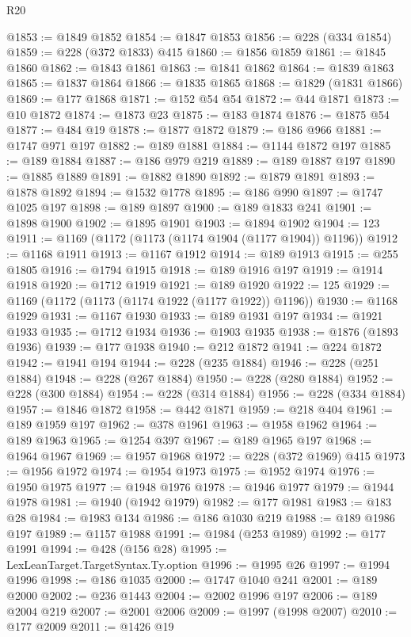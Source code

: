 \begin{lexlean}{R20}
\begin{coremodule}
@1853 := @1849 @1852
@1854 := @1847 @1853
@1856 := @228 (@334 @1854)
@1859 := @228 (@372 @1833) @415
@1860 := @1856 @1859
@1861 := @1845 @1860
@1862 := @1843 @1861
@1863 := @1841 @1862
@1864 := @1839 @1863
@1865 := @1837 @1864
@1866 := @1835 @1865
@1868 := @1829 (@1831 @1866)
@1869 := @177 @1868
@1871 := @152 @54 @54
@1872 := @44 @1871
@1873 := @10 @1872
@1874 := @1873 @23
@1875 := @183 @1874
@1876 := @1875 @54
@1877 := @484 @19
@1878 := @1877 @1872
@1879 := @186 @966
@1881 := @1747 @971 @197
@1882 := @189 @1881
@1884 := @1144 @1872 @197
@1885 := @189 @1884
@1887 := @186 @979 @219
@1889 := @189 @1887 @197
@1890 := @1885 @1889
@1891 := @1882 @1890
@1892 := @1879 @1891
@1893 := @1878 @1892
@1894 := @1532 @1778
@1895 := @186 @990
@1897 := @1747 @1025 @197
@1898 := @189 @1897
@1900 := @189 @1833 @241
@1901 := @1898 @1900
@1902 := @1895 @1901
@1903 := @1894 @1902
@1904 := 123
@1911 := @1169 (@1172 (@1173 (@1174 @1904 (@1177 @1904)) @1196))
@1912 := @1168 @1911
@1913 := @1167 @1912
@1914 := @189 @1913
@1915 := @255 @1805
@1916 := @1794 @1915
@1918 := @189 @1916 @197
@1919 := @1914 @1918
@1920 := @1712 @1919
@1921 := @189 @1920
@1922 := 125
@1929 := @1169 (@1172 (@1173 (@1174 @1922 (@1177 @1922)) @1196))
@1930 := @1168 @1929
@1931 := @1167 @1930
@1933 := @189 @1931 @197
@1934 := @1921 @1933
@1935 := @1712 @1934
@1936 := @1903 @1935
@1938 := @1876 (@1893 @1936)
@1939 := @177 @1938
@1940 := @212 @1872
@1941 := @224 @1872
@1942 := @1941 @194
@1944 := @228 (@235 @1884)
@1946 := @228 (@251 @1884)
@1948 := @228 (@267 @1884)
@1950 := @228 (@280 @1884)
@1952 := @228 (@300 @1884)
@1954 := @228 (@314 @1884)
@1956 := @228 (@334 @1884)
@1957 := @1846 @1872
@1958 := @442 @1871
@1959 := @218 @404
@1961 := @189 @1959 @197
@1962 := @378 @1961
@1963 := @1958 @1962
@1964 := @189 @1963
@1965 := @1254 @397
@1967 := @189 @1965 @197
@1968 := @1964 @1967
@1969 := @1957 @1968
@1972 := @228 (@372 @1969) @415
@1973 := @1956 @1972
@1974 := @1954 @1973
@1975 := @1952 @1974
@1976 := @1950 @1975
@1977 := @1948 @1976
@1978 := @1946 @1977
@1979 := @1944 @1978
@1981 := @1940 (@1942 @1979)
@1982 := @177 @1981
@1983 := @183 @28
@1984 := @1983 @134
@1986 := @186 @1030 @219
@1988 := @189 @1986 @197
@1989 := @1157 @1988
@1991 := @1984 (@253 @1989)
@1992 := @177 @1991
@1994 := @428 (@156 @28)
@1995 := LexLeanTarget.TargetSyntax.Ty.option
@1996 := @1995 @26
@1997 := @1994 @1996
@1998 := @186 @1035
@2000 := @1747 @1040 @241
@2001 := @189 @2000
@2002 := @236 @1443
@2004 := @2002 @1996 @197
@2006 := @189 @2004 @219
@2007 := @2001 @2006
@2009 := @1997 (@1998 @2007)
@2010 := @177 @2009
@2011 := @1426 @19

\end{coremodule}
\end{lexlean}
